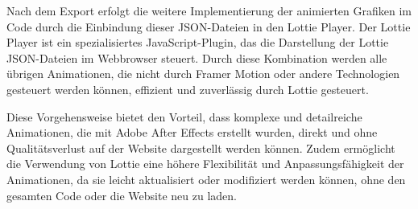 Nach dem Export erfolgt die weitere Implementierung der animierten Grafiken im Code durch die Einbindung dieser JSON-Dateien 
in den Lottie Player. Der Lottie Player ist ein spezialisiertes JavaScript-Plugin, das die Darstellung der Lottie JSON-Dateien im 
Webbrowser steuert. Durch diese Kombination werden alle übrigen Animationen, die nicht durch Framer Motion oder andere Technologien 
gesteuert werden können, effizient und zuverlässig durch Lottie gesteuert.

Diese Vorgehensweise bietet den Vorteil, dass komplexe und detailreiche Animationen, die mit Adobe After Effects erstellt wurden, 
direkt und ohne Qualitätsverlust auf der Website dargestellt werden können. Zudem ermöglicht die Verwendung von Lottie eine höhere 
Flexibilität und Anpassungsfähigkeit der Animationen, da sie leicht aktualisiert oder modifiziert werden können, ohne den gesamten Code 
oder die Website neu zu laden.

